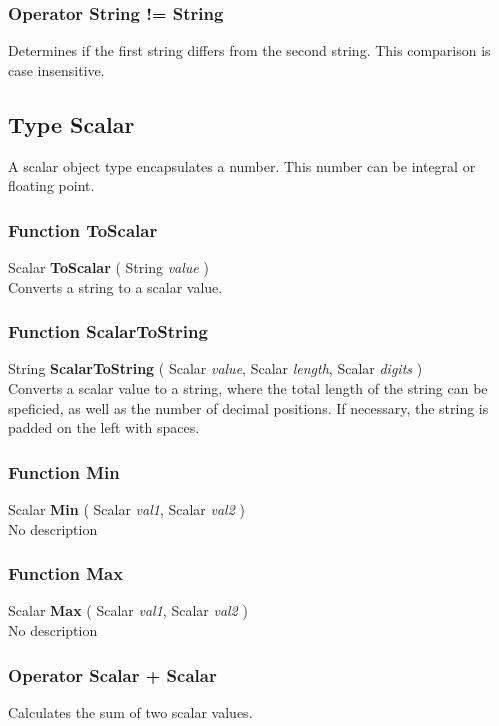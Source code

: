 \subsubsection{Operator String != String \label{O:String!=String}}
Determines if the first string differs from the second string. This comparison is case insensitive.

\subsection{Type Scalar \label{T:Scalar}}
A scalar object type encapsulates a number. This number can be integral or floating point.

\subsubsection{Function ToScalar \label{F:ToScalar}}
Scalar \textbf{ToScalar} ( String \textit{value} ) \\
Converts a string to a scalar value.

\subsubsection{Function ScalarToString \label{F:ScalarToString}}
String \textbf{ScalarToString} ( Scalar \textit{value}, Scalar \textit{length}, Scalar \textit{digits} ) \\
Converts a scalar value to a string, where the total length of the string can be speficied, as well as the number of decimal positions. If necessary, the string is padded on the left with spaces.

\subsubsection{Function Min \label{F:Min}}
Scalar \textbf{Min} ( Scalar \textit{val1}, Scalar \textit{val2} ) \\
No description

\subsubsection{Function Max \label{F:Max}}
Scalar \textbf{Max} ( Scalar \textit{val1}, Scalar \textit{val2} ) \\
No description

\subsubsection{Operator Scalar + Scalar \label{O:Scalar+Scalar}}
Calculates the sum of two scalar values.

